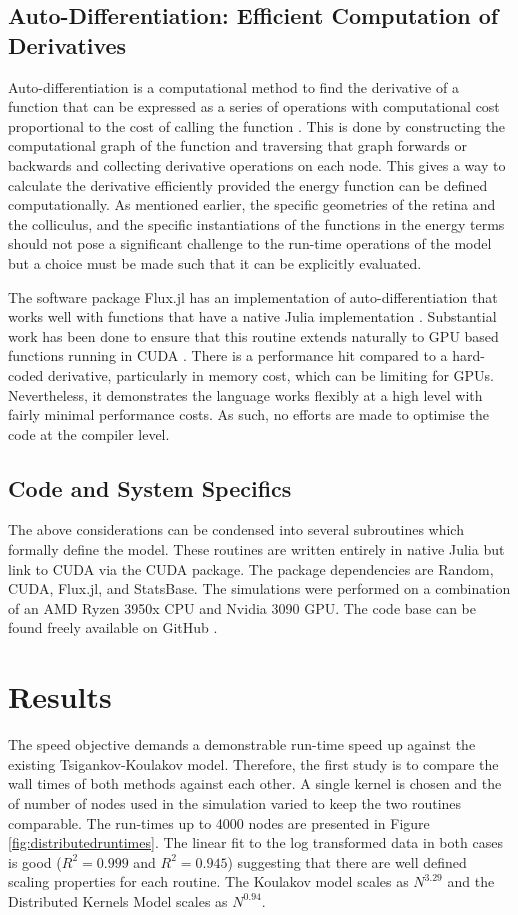 \subsection{Auto-Differentiation: Efficient Computation of Derivatives} \label{section:autodifferentiation}
Auto-differentiation is a computational method to find the derivative of a function that can be expressed as a series of operations with computational cost proportional to the cost of calling the function \cite{Speelpenning1980-mt, innes2019dont}. This is done by constructing the computational graph of the function and traversing that graph forwards or backwards and collecting derivative operations on each node. This gives a way to calculate the derivative efficiently provided the energy function can be defined computationally. As mentioned earlier, the specific geometries of the retina and the colliculus, and the specific instantiations of the functions in the energy terms should not pose a significant challenge to the run-time operations of the model but a choice must be made such that it can be explicitly evaluated. 

The software package Flux.jl has an implementation of auto-differentiation that works well with functions that have a native Julia implementation \cite{innes2019dont, Flux.jl-2018}. Substantial work has been done to ensure that this routine extends naturally to GPU based functions running in CUDA \cite{innes2018}. There is a performance hit compared to a hard-coded derivative, particularly in memory cost, which can be limiting for GPUs. Nevertheless, it demonstrates the language works flexibly at a high level with fairly minimal performance costs. As such, no efforts are made to optimise the code at the compiler level.
\subsection{Code and System Specifics}
The above considerations can be condensed into several subroutines which formally define the model. These routines are written entirely in native Julia but link to CUDA via the CUDA package. The package dependencies are Random, CUDA, Flux.jl,  and StatsBase. The simulations were performed on a combination of an AMD Ryzen 3950x CPU and Nvidia 3090 GPU. The code base can be found freely available on GitHub \cite{DistributedKernels}. 
\section{Results}
The speed objective demands a demonstrable run-time speed up against the existing Tsigankov-Koulakov model. Therefore, the first study is to compare the wall times of both methods against each other. A single kernel is chosen and the of number of nodes used in the simulation varied to keep the two routines comparable. The run-times up to 4000 nodes are presented in Figure \ref{fig:distributedruntimes}. The linear fit to the log transformed data in both cases is good ($R^2 = 0.999$ and $R^2=0.945$) suggesting that there are well defined scaling properties for each routine. The Koulakov model scales as $N^{3.29}$ and the Distributed Kernels Model scales as $N^{0.94}$.

